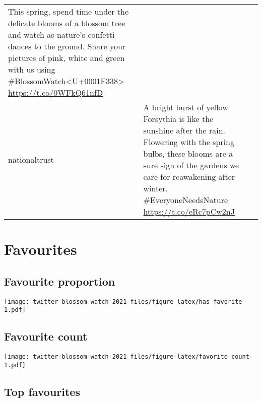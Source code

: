 \documentclass[
]{article}
\begin{document}
\begin{longtable}[]{@{}llr@{}}
\begin{minipage}[t]{0.65\columnwidth}
This spring, spend time under the delicate blooms of a blossom tree and
watch as nature's confetti dances to the ground. Share your pictures of
pink, white and green with us using
\#BlossomWatch\textless U+0001F338\textgreater{}
\url{https://t.co/0WFkQ61nfD}\strut
\end{minipage} & \begin{minipage}[t]{0.12\columnwidth}\raggedleft
40\strut
\end{minipage}\tabularnewline
\begin{minipage}[t]{0.14\columnwidth}\raggedright
nationaltrust\strut
\end{minipage} & \begin{minipage}[t]{0.65\columnwidth}\raggedright
A bright burst of yellow Forsythia is like the sunshine after the rain.
Flowering with the spring bulbs, these blooms are a sure sign of the
gardens we care for reawakening after winter. \#EveryoneNeedsNature
\url{https://t.co/eRc7pCw2nJ}\strut
\end{minipage} & \begin{minipage}[t]{0.12\columnwidth}\raggedleft
39\strut
\end{minipage}\tabularnewline
\bottomrule
\end{longtable}

\hypertarget{favourites}{%
\section{Favourites}\label{favourites}}

\hypertarget{favourite-proportion}{%
\subsection{Favourite proportion}\label{favourite-proportion}}

\texttt{[image: twitter-blossom-watch-2021\_files/figure-latex/has-favorite-1.pdf]}

\hypertarget{favourite-count}{%
\subsection{Favourite count}\label{favourite-count}}

\texttt{[image: twitter-blossom-watch-2021\_files/figure-latex/favorite-count-1.pdf]}

\hypertarget{top-favourites}{%
\subsection{Top favourites}\label{top-favourites}}
\end{document}
